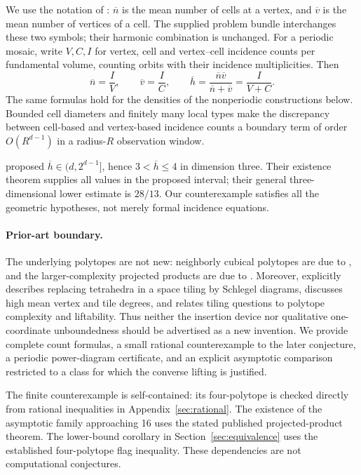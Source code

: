 \documentclass[11pt,a4paper]{article}
\theoremstyle{definition}\newtheorem{definition}[theorem]{Definition}
\theoremstyle{remark}\newtheorem{remark}[theorem]{Remark}
\newcommand{\hbarM}{\overline h}\newcommand{\nbar}{\overline n}\newcommand{\vbar}{\overline v}
\begin{document}
We use the notation of \citet{DL}: \(\nbar\) is the mean number of cells at a vertex, and \(\vbar\) is the mean number of vertices of a cell. The supplied problem bundle interchanges these two symbols; their harmonic combination is unchanged. For a periodic mosaic, write \(V,C,I\) for vertex, cell and vertex--cell incidence counts per fundamental volume, counting orbits with their incidence multiplicities. Then
\begin{equation}\label{eq:basic}
 \nbar=\frac I V,\qquad \vbar=\frac I C,\qquad
 \hbarM=\frac{\nbar\vbar}{\nbar+\vbar}=\frac I{V+C}.
\end{equation}
The same formulas hold for the densities of the nonperiodic constructions below. Bounded cell diameters and finitely many local types make the discrepancy between cell-based and vertex-based incidence counts a boundary term of order \(O(R^{d-1})\) in a radius-\(R\) observation window.

\citet[Conjecture 1]{DL} proposed \(\hbarM\in(d,2^{d-1}]\), hence \(3<\hbarM\le4\) in dimension three. Their existence theorem supplies all values in the proposed interval; their general three-dimensional lower estimate is \(28/13\). Our counterexample satisfies all the geometric hypotheses, not merely formal incidence equations.

\paragraph{Prior-art boundary.}
The underlying polytopes are not new: neighborly cubical polytopes are due to \citet{JZ}, and the larger-complexity projected products are due to \citet{Z04}. Moreover, \citet[Section 7]{Z02} explicitly describes replacing tetrahedra in a space tiling by Schlegel diagrams, discusses high mean vertex and tile degrees, and relates tiling questions to polytope complexity and liftability. Thus neither the insertion device nor qualitative one-coordinate unboundedness should be advertised as a new invention. We provide complete count formulas, a small rational counterexample to the later conjecture, a periodic power-diagram certificate, and an explicit asymptotic comparison restricted to a class for which the converse lifting is justified.

The finite counterexample is self-contained: its four-polytope is checked directly from rational inequalities in Appendix~\ref{sec:rational}. The existence of the asymptotic family approaching 16 uses the stated published projected-product theorem. The lower-bound corollary in Section~\ref{sec:equivalence} uses the established four-polytope flag inequality. These dependencies are not computational conjectures.
\end{document}
